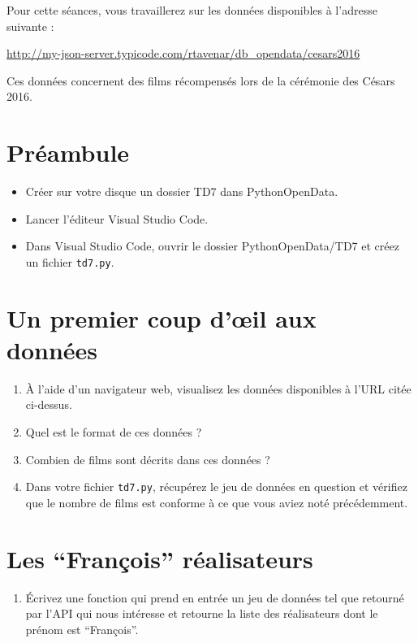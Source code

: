 \documentclass[11pt,a4paper]{article}
\begin{document}
Pour cette séances, vous travaillerez sur les données disponibles à l'adresse suivante :

\begin{center}
    \url{http://my-json-server.typicode.com/rtavenar/db_opendata/cesars2016}
\end{center}

Ces données concernent des films récompensés lors de la cérémonie des Césars 2016.

\section*{Préambule}
\begin{itemize}
    \item Créer sur votre disque un dossier TD7 dans PythonOpenData.
    \item Lancer l'éditeur Visual Studio Code.
    \item Dans Visual Studio Code, ouvrir le dossier PythonOpenData/TD7 et créez un fichier \verb+td7.py+. 
\end{itemize}



\section{Un premier coup d'\oe{}il aux données}

\begin{enumerate}
    \item À l'aide d'un navigateur web, visualisez les données disponibles à l'URL citée ci-dessus.
    \item Quel est le format de ces données ?
    \item Combien de films sont décrits dans ces données ?
    \item Dans votre fichier \verb+td7.py+, récupérez le jeu de données en question et vérifiez que le nombre de films est conforme à ce que vous aviez noté précédemment.
\end{enumerate}

\section{Les ``François'' réalisateurs}

\begin{enumerate}
    \item Écrivez une fonction qui prend en entrée un jeu de données tel que retourné par l'API qui nous intéresse et retourne la liste des réalisateurs dont le prénom est ``François''.
\end{enumerate}
\end{document}
